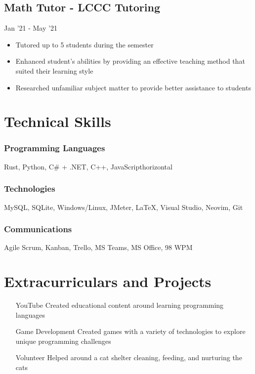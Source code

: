 \documentclass{article}
\begin{document}
\subsection{Math Tutor - LCCC Tutoring} \hfill Jan '21 - May '21
\begin{itemize}
  \item Tutored up to 5 students during the semester
  \item Enhanced student’s abilities by providing an effective teaching method that suited their learning style
  \item Researched unfamiliar subject matter to provide better assistance to students
\end{itemize}

\section{Technical Skills}

\subsubsection{Programming Languages} Rust, Python, C\# + .NET, C++, JavaScripthorizontal

\subsubsection{Technologies} MySQL, SQLite, Windows/Linux, JMeter, {\LaTeX}, Visual Studio, Neovim, Git

\subsubsection{Communications} Agile Scrum, Kanban, Trello, MS Teams, MS Office, 98 WPM

\section{Extracurriculars and Projects}
\begin{itemize}
  \item[YouTube] Created educational content around learning programming languages
  \item[Game Development] Created games with a variety of technologies to explore unique programming challenges
  \item[Volunteer] Helped around a cat shelter cleaning, feeding, and nurturing the cats
\end{itemize}

\thispagestyle{empty}
\end{document}
